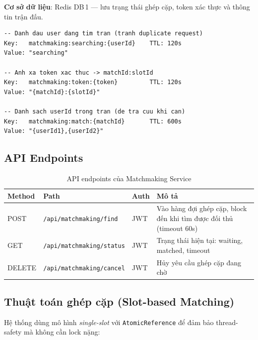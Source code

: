 \documentclass[12pt,a4paper]{report}
\begin{document}
\textbf{Cơ sở dữ liệu}: Redis DB\,1 --- lưu trạng thái ghép cặp, token xác thực và thông tin trận đấu.

\begin{lstlisting}[style=bashStyle, caption={Schema Redis của Matchmaking Service}, label={lst:matchredis}]
-- Danh dau user dang tim tran (tranh duplicate request)
Key:   matchmaking:searching:{userId}    TTL: 120s
Value: "searching"

-- Anh xa token xac thuc -> matchId:slotId
Key:   matchmaking:token:{token}         TTL: 120s
Value: "{matchId}:{slotId}"

-- Danh sach userId trong tran (de tra cuu khi can)
Key:   matchmaking:match:{matchId}       TTL: 600s
Value: "{userId1},{userId2}"
\end{lstlisting}

\subsection{API Endpoints}

\begin{table}[H]
\centering
\caption{API endpoints của Matchmaking Service}
\label{tab:matchapi}
\begin{tabularx}{\textwidth}{lllX}
\toprule
\textbf{Method} & \textbf{Path} & \textbf{Auth} & \textbf{Mô tả} \\
\midrule
POST & \texttt{/api/matchmaking/find}   & JWT & Vào hàng đợi ghép cặp, block đến khi tìm được đối thủ (timeout 60s) \\
GET  & \texttt{/api/matchmaking/status} & JWT & Trạng thái hiện tại: waiting, matched, timeout \\
DELETE & \texttt{/api/matchmaking/cancel} & JWT & Hủy yêu cầu ghép cặp đang chờ \\
\bottomrule
\end{tabularx}
\end{table}

\subsection{Thuật toán ghép cặp (Slot-based Matching)}

Hệ thống dùng mô hình \textit{single-slot} với \texttt{AtomicReference} để đảm bảo thread-safety mà không cần lock nặng:
\end{document}
